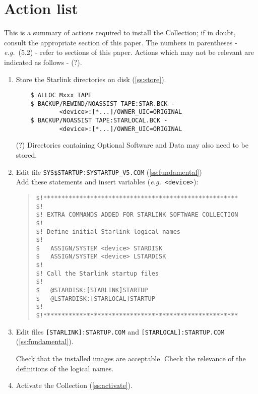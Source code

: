 \newpage

\section{Action list}
\label{se:actions}

This is a summary of actions required to install the Collection; if in doubt,
consult the appropriate section of this paper. The numbers in parentheses -
{\em e.g.}\ (5.2) - refer to sections of this paper. Actions which may not be
relevant are indicated as follows - (?).

\begin{enumerate}

\item Store the Starlink directories on disk (\ref{ss:store}).

\begin{verbatim}
    $ ALLOC Mxxx TAPE
    $ BACKUP/REWIND/NOASSIST TAPE:STAR.BCK - 
            <device>:[*...]/OWNER_UIC=ORIGINAL
    $ BACKUP/NOASSIST TAPE:STARLOCAL.BCK - 
            <device>:[*...]/OWNER_UIC=ORIGINAL
\end{verbatim}

(?) Directories containing Optional Software and Data may also need to be
stored.

\item Edit file {\tt SYS\$STARTUP:SYSTARTUP\_V5.COM} (\ref{ss:fundamental})\\
Add these statements and insert variables ({\em e.g.}\ \verb+<device>+):

\begin{quote}\small
\begin{verbatim}
$!******************************************************
$!
$! EXTRA COMMANDS ADDED FOR STARLINK SOFTWARE COLLECTION
$!
$! Define initial Starlink logical names
$!
$	ASSIGN/SYSTEM <device> STARDISK
$	ASSIGN/SYSTEM <device> LSTARDISK
$!
$! Call the Starlink startup files
$!
$	@STARDISK:[STARLINK]STARTUP
$	@LSTARDISK:[STARLOCAL]STARTUP
$!
$!******************************************************
\end{verbatim}
\end{quote}

\item Edit files {\tt [STARLINK]:STARTUP.COM} and {\tt [STARLOCAL]:STARTUP.COM}
(\ref{ss:fundamental}).

Check that the installed images are acceptable. Check the relevance of the
definitions of the logical names.

\item Activate the Collection (\ref{ss:activate}).


\end{enumerate}

